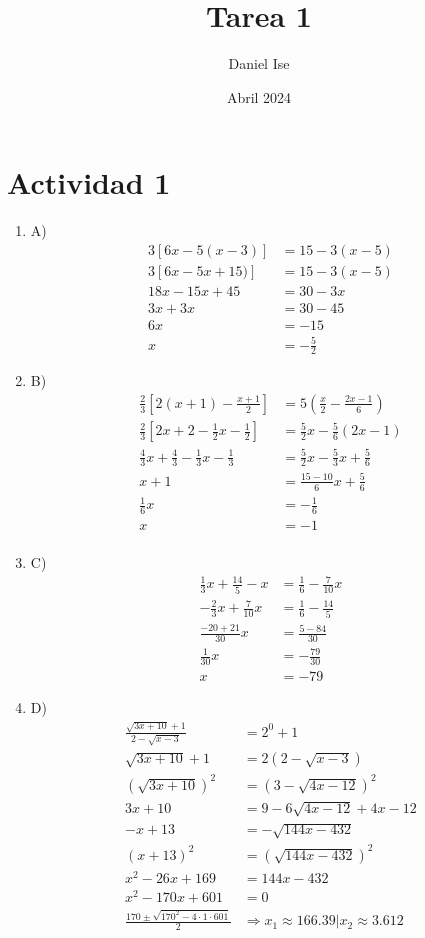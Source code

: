 \documentclass{article}
\title{Tarea 1}
\author{Daniel Ise}
\date{Abril 2024}
\begin{document}

\section*{Actividad 1}
\begin{enumerate}
	\item[] A) 
	\begin{align*}
		3[ 6x - 5(x-3)] &= 15 - 3(x-5)\\
		3[6x-5x+15)]&=15-3(x-5)\\
		18x-15x+45 &= 30 - 3x\\
		3x + 3x &= 30 - 45\\
		6x &= -15\\
		x &= -\frac{5}{2}
	\end{align*}

	\item[] B)
	\begin{align*}
		\frac{2}{3} \left[ 2(x+1) - \frac{x+1}{2} \right] &= 5 \left( \frac{x}{2} - \frac{2x - 1}{6}\right) \\
		\frac{2}{3} \left[ 2x+2 - \frac{1}{2}x - \frac{1}{2} \right] &= \frac{5}{2}x - \frac{5}{6}(2x-1)  \\
		\frac{4}{3}x + \frac{4}{3} - \frac{1}{3}x - \frac{1}{3} &= \frac{5}{2}x - \frac{5}{3}x + \frac{5}{6}\\
		x+1 &= \frac{15-10}{6}x + \frac{5}{6}\\
		\frac{1}{6}x &= - \frac{1}{6}\\
		x&=-1\\
	\end{align*}

	\item[] C)
	\begin{align*}
		\frac{1}{3}x + \frac{14}{5} - x &= \frac{1}{6} - \frac{7}{10}x \\
		- \frac{2}{3}x + \frac{7}{10}x &= \frac{1}{6} - \frac{14}{5}\\
		\frac{-20+21}{30}x &= \frac{5-84}{30}\\
		\frac{1}{30}x &= - \frac{79}{30}\\
		x &= -79
	\end{align*}

	\item[] D)
	\begin{align*}
		\frac{\sqrt{3x+10}+1}{2-\sqrt{x-3}} &= 2^{0} + 1\\
		\sqrt{3x+10}+1 &= 2 \left( 2-\sqrt{x-3} \right)\\
		\left( \sqrt{3x+10} \right)^{2} &= \left( 3-\sqrt{4x-12} \right)^{2}\\
		3x+10 &= 9 - 6\sqrt{4x-12} + 4x - 12\\
		-x + 13 &= - \sqrt{144x - 432}\\
		(x + 13)^{2} &= (\sqrt{144x - 432})^{2}\\
		x^2 - 26x + 169 &= 144x - 432\\
		x^2 - 170x + 601 &= 0\\
		\frac{170 \pm \sqrt{170^2 - 4 \cdot 1 \cdot 601}}{2} &\Rightarrow x_{1}\approx 166.39 | x_{2} \approx 3.612\\
	\end{align*}


\end{enumerate}
\end{document}
